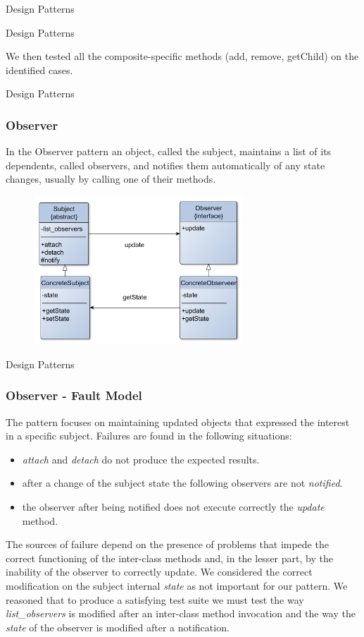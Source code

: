 \documentclass{beamer}
\begin{document}
\begin{section}{Design Patterns}
\begin{subsection}{Design Patterns}
\begin{frame}
We then tested all the composite-specific methods (add, remove, getChild) on the identified cases.	
	\end{frame}
\end{subsection}

\begin{subsection}{Design Patterns}
	\begin{frame}
		\frametitle{Observer}
		In the Observer pattern an object, called the subject, maintains a list of its dependents, called observers, and notifies them automatically of any state changes, usually by calling one of their methods.
		
\begin{figure}[!h]
	\centering
	\includegraphics[width=0.7\textwidth]{./Observer/ClassDiagram.png}
	\label{ObclassDiag}
\end{figure}
		
	\end{frame}
\end{subsection}

\begin{subsection}{Design Patterns}
	\begin{frame}
		\frametitle{Observer - Fault Model}
The pattern focuses on maintaining updated objects that expressed the interest in a specific subject. Failures are found in the following situations:  
\begin{itemize}
	\item \textit{attach} and \textit{detach} do not produce the expected results.
	\item after a change of the subject state the following observers are not \textit{notified}.
	\item the observer after being notified does not execute correctly the \textit{update} method.
\end{itemize}
		\vspace{5mm}
		The sources of failure depend on the presence of problems that impede the correct functioning of the inter-class methods and, in the lesser part, by the inability of the observer to correctly update. We considered the correct modification on the subject internal \textit{state} as not important for our pattern.  We reasoned that to produce a satisfying test suite we must test the way \textit{list\_observers} is modified after an inter-class method invocation and the way the \textit{state} of the observer is modified after a notification.
		

\end{frame}
\end{subsection}
\end{section}
\end{document}
